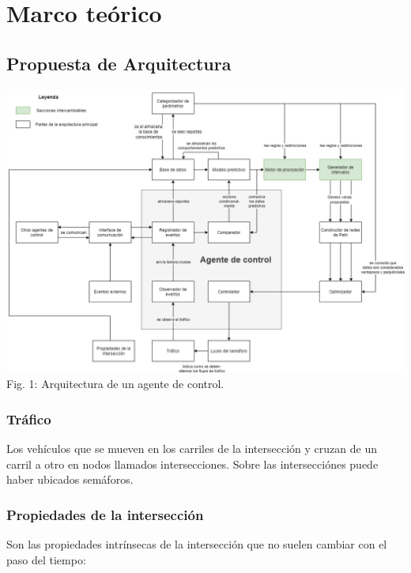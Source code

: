 
\chapter{Marco teórico} %
\graphicspath{{./../imagenes/}}
\linespread{1.3}
\hypertarget{propuesta-de-arquitectura}{%
\section{Propuesta de Arquitectura}\label{propuesta-de-arquitectura}}

\includegraphics[width=\textwidth]{arquitectura.png} Fig. 1:
Arquitectura de un agente de control.

\hypertarget{truxe1fico}{%
\subsection{Tráfico}\label{truxe1fico}}

Los vehículos que se mueven en los carriles de la intersección y cruzan
de un carril a otro en nodos llamados intersecciones. Sobre las
intersecciónes puede haber ubicados semáforos.

\hypertarget{propiedades-de-la-intersecciuxf3n}{%
\subsection{Propiedades de la
intersección}\label{propiedades-de-la-intersecciuxf3n}}

Son las propiedades intrínsecas de la intersección que no suelen cambiar
con el paso del tiempo:

